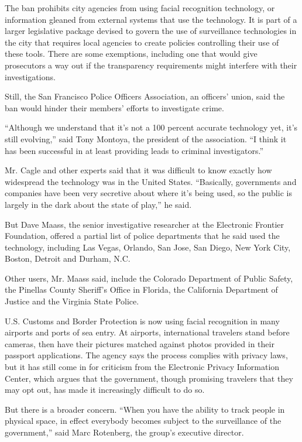 The ban prohibits city agencies from using facial recognition
technology, or information gleaned from external systems that use the
technology. It is part of a larger legislative package devised to govern
the use of surveillance technologies in the city that requires local
agencies to create policies controlling their use of these tools. There
are some exemptions, including one that would give prosecutors a way out
if the transparency requirements might interfere with their
investigations.

Still, the San Francisco Police Officers Association, an officers'
union, said the ban would hinder their members' efforts to investigate
crime.

``Although we understand that it's not a 100 percent accurate technology
yet, it's still evolving,'' said Tony Montoya, the president of the
association. ``I think it has been successful in at least providing
leads to criminal investigators.''

Mr. Cagle and other experts said that it was difficult to know exactly
how widespread the technology was in the United States. ``Basically,
governments and companies have been very secretive about where it's
being used, so the public is largely in the dark about the state of
play,'' he said.

But Dave Maass, the senior investigative researcher at the Electronic
Frontier Foundation, offered a partial list of police departments that
he said used the technology, including Las Vegas, Orlando, San Jose, San
Diego, New York City, Boston, Detroit and Durham, N.C.

Other users, Mr. Maass said, include the Colorado Department of Public
Safety, the Pinellas County Sheriff's Office in Florida, the California
Department of Justice and the Virginia State Police.

U.S. Customs and Border Protection is now using facial recognition in
many airports and ports of sea entry. At airports, international
travelers stand before cameras, then have their pictures matched against
photos provided in their passport applications. The agency says the
process complies with privacy laws, but it has still come in for
criticism from the Electronic Privacy Information Center, which argues
that the government, though promising travelers that they may opt out,
has made it increasingly difficult to do so.

But there is a broader concern. ``When you have the ability to track
people in physical space, in effect everybody becomes subject to the
surveillance of the government,'' said Marc Rotenberg, the group's
executive director.

